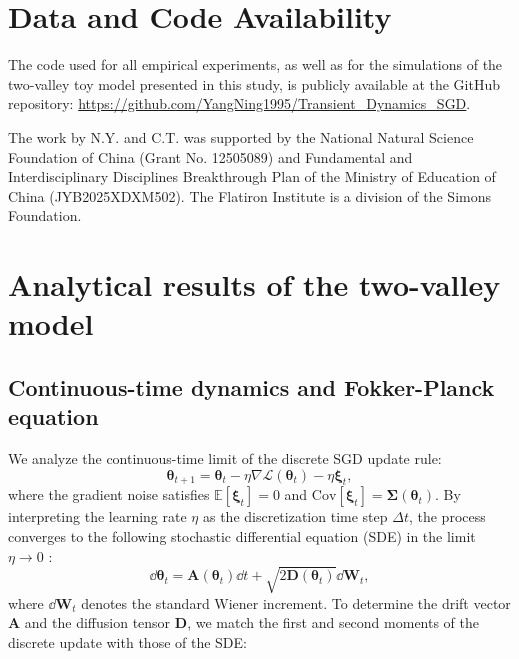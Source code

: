 \documentclass[aps,prx,reprint,superscriptaddress,longbibliography,nofootinbib,floatfix]{revtex4-2}
\begin{document}
\section*{Data and Code Availability}
The code used for all empirical experiments, as well as for the simulations 
of the two-valley toy model presented in this study, is publicly available 
at the GitHub repository: \url{https://github.com/YangNing1995/Transient_Dynamics_SGD}.

\begin{acknowledgments}
The work by N.Y. and C.T. was supported by the National Natural Science Foundation of China (Grant No. 12505089) and Fundamental and Interdisciplinary Disciplines Breakthrough Plan of the Ministry of Education of China (JYB2025XDXM502). The Flatiron Institute is a division of the Simons Foundation.
\end{acknowledgments}

\appendix

\setcounter{equation}{0}
\renewcommand{\theequation}{A\arabic{equation}}

\section{Analytical results of the two-valley model}

\subsection{Continuous-time dynamics and Fokker-Planck equation} \label{sec:appendix1}

We analyze the continuous-time limit of the discrete SGD update rule:
\begin{equation}
    \bm{\theta}_{t+1} = \bm{\theta}_t - \eta \nabla \mathcal{L}(\bm{\theta}_t) - \eta \bm{\xi}_t,
    \label{eq:si_sgd_update} 
\end{equation}
where the gradient noise satisfies $\mathbb{E}[\bm{\xi}_t] = 0$ and $\text{Cov}[\bm{\xi}_t] = \mathbf{\Sigma}(\bm{\theta}_t)$. By interpreting the learning rate $\eta$ as the discretization time step $\Delta t$, the process converges to the following stochastic differential equation (SDE) in the limit $\eta \to 0$ \cite{liHessianBasedAnalysis2020,liStochasticModifiedEquations2017}:
\begin{equation}
    \dd\bm{\theta}_t = \mathbf{A}(\bm{\theta}_t) \dd t + \sqrt{2\mathbf{D}(\bm{\theta}_t)} \dd \mathbf{W}_t,
    \label{eq:si_sde} 
\end{equation}
where $\dd \mathbf{W}_t$ denotes the standard Wiener increment. To determine the drift vector $\mathbf{A}$ and the diffusion tensor $\mathbf{D}$, we match the first and second moments of the discrete update with those of the SDE:
\end{document}
